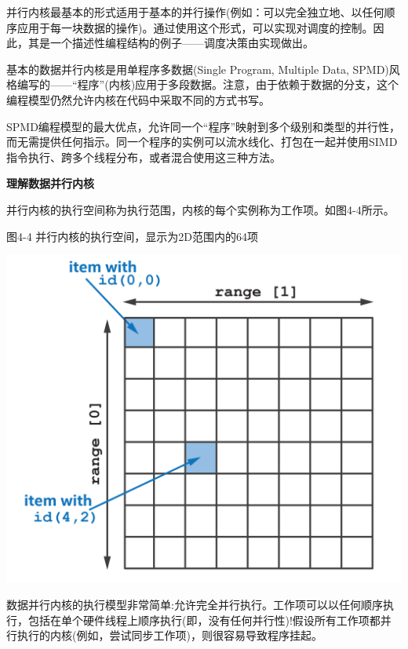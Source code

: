 并行内核最基本的形式适用于基本的并行操作(例如：可以完全独立地、以任何顺序应用于每一块数据的操作)。通过使用这个形式，可以实现对调度的控制。因此，其是一个描述性编程结构的例子——调度决策由实现做出。\par

基本的数据并行内核是用单程序多数据(Single Program, Multiple Data, SPMD)风格编写的——“程序”(内核)应用于多段数据。注意，由于依赖于数据的分支，这个编程模型仍然允许内核在代码中采取不同的方式书写。\par

SPMD编程模型的最大优点，允许同一个“程序”映射到多个级别和类型的并行性，而无需提供任何指示。同一个程序的实例可以流水线化、打包在一起并使用SIMD指令执行、跨多个线程分布，或者混合使用这三种方法。\par

\hspace*{\fill} \par %
\textbf{理解数据并行内核}

并行内核的执行空间称为执行范围，内核的每个实例称为工作项。如图4-4所示。\par

\hspace*{\fill} \par %
图4-4 并行内核的执行空间，显示为2D范围内的64项
\begin{center}
	\includegraphics[width=1.\textwidth]{content/chapter-4/images/3}
\end{center}

数据并行内核的执行模型非常简单:允许完全并行执行。工作项可以以任何顺序执行，包括在单个硬件线程上顺序执行(即，没有任何并行性)!假设所有工作项都并行执行的内核(例如，尝试同步工作项)，则很容易导致程序挂起。\par

